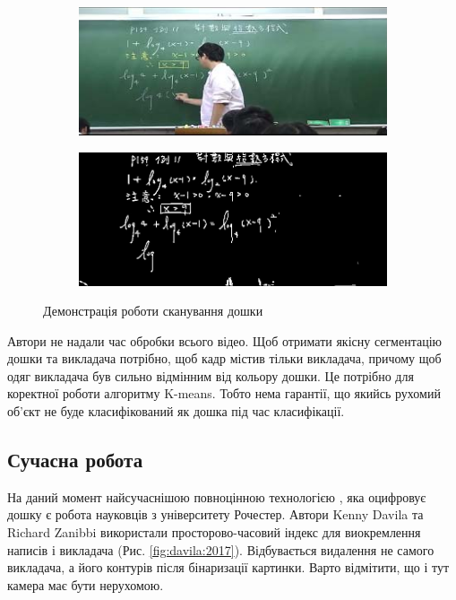 \begin{figure}[H]
  \centering
  \begin{subfigure}[b]{0.35\textwidth}
    \centering
    \includegraphics[width=\textwidth]{images/yeh_1}
  \end{subfigure}
  \begin{subfigure}[b]{0.35\textwidth}
    \centering
    \includegraphics[width=\textwidth]{images/yeh_2}
  \end{subfigure}
  \caption{Демонстрація роботи сканування дошки \cite{yeh}
    \label{fig:yeh}
  }
\end{figure}

Автори не надали час обробки всього відео. Щоб отримати якісну сегментацію
дошки та викладача потрібно, щоб кадр містив тільки викладача, причому щоб одяг викладача
був сильно відмінним від кольору дошки. Це потрібно для коректної роботи алгоритму K-means.
Тобто нема гарантії, що якийсь рухомий об'єкт не буде класифікований як дошка під час класифікації.

\subsection{Сучасна робота}

На даний момент найсучаснішою повноцінною технологією \cite{davila:2017}, яка оцифровує дошку є робота
науковців з університету Рочестер. Автори Kenny Davila та Richard Zanibbi
використали просторово-часовий індекс для виокремлення написів і викладача (Рис. \ref{fig:davila:2017}).
Відбувається видалення не самого викладача,  а його контурів після бінаризації картинки.
Варто відмітити, що і тут камера має бути нерухомою.


